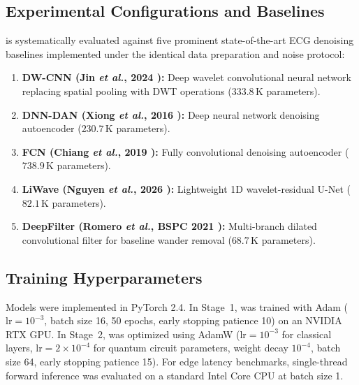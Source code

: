 \begin{table}[!htbp]
\caption{Beat Distributions Across the Inter-Patient DS1/DS2 Split (AAMI Classes N, S, V)}
\label{tab:ds_split}
\centering
{}
\end{table}

\subsection{Experimental Configurations and Baselines}
\HSL{} is systematically evaluated against five prominent state-of-the-art ECG denoising baselines implemented under the identical data preparation and noise protocol:
\begin{enumerate}
    \item \textbf{DW-CNN (Jin \emph{et al.}, 2024 \cite{jin2024}):} Deep wavelet convolutional neural network replacing spatial pooling with DWT operations ($333.8$\,K parameters).
    \item \textbf{DNN-DAN (Xiong \emph{et al.}, 2016 \cite{xiong2016}):} Deep neural network denoising autoencoder ($230.7$\,K parameters).
    \item \textbf{FCN (Chiang \emph{et al.}, 2019 \cite{chiang2019}):} Fully convolutional denoising autoencoder ($738.9$\,K parameters).
    \item \textbf{LiWave (Nguyen \emph{et al.}, 2026 \cite{nguyen2026liwave}):} Lightweight 1D wavelet-residual U-Net ($82.1$\,K parameters).
    \item \textbf{DeepFilter (Romero \emph{et al.}, BSPC 2021 \cite{romero2021}):} Multi-branch dilated convolutional filter for baseline wander removal ($68.7$\,K parameters).
\end{enumerate}

\subsection{Training Hyperparameters}
Models were implemented in PyTorch 2.4. In Stage~1, \HSL{} was trained with Adam ($\text{lr} = 10^{-3}$, batch size 16, 50 epochs, early stopping patience 10) on an NVIDIA RTX GPU. In Stage~2, \RRN{} was optimized using AdamW ($\text{lr} = 10^{-3}$ for classical layers, $\text{lr} = 2 \times 10^{-4}$ for quantum circuit parameters, weight decay $10^{-4}$, batch size 64, early stopping patience 15). For edge latency benchmarks, single-thread forward inference was evaluated on a standard Intel Core CPU at batch size 1.

